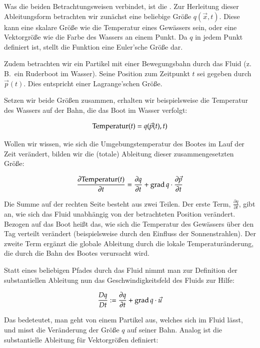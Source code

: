 Was die beiden Betrachtungsweisen verbindet, ist die
. Zur Herleitung dieser
Ableitungsform betrachten wir zunächst eine beliebige Größe
$q(\vec{x},t)$. Diese kann eine skalare Größe wie \PimiddyzB{} die Temperatur
eines Gewässers sein, oder eine Vektorgröße wie die Farbe des Wassers
an einem Punkt. Da $q$ in jedem Punkt definiert ist, stellt die
Funktion eine Euler'sche Größe dar.

Zudem betrachten wir ein Partikel mit einer Bewegungsbahn durch das
Fluid (z.\,B.\  ein Ruderboot im Wasser). Seine Position zum Zeitpunkt
$t$ sei gegeben durch $\vec{p}(t)$. Dies entspricht einer
Lagrange'schen Größe.

Setzen wir beide Größen zusammen, erhalten wir beispielsweise die
Temperatur des Wassers auf der Bahn, die das Boot im Wasser verfolgt:

\begin{equation}
\textnormal{Temperatur}(t) = q(\vec{p}(t),t)
\end{equation}

Wollen wir wissen, wie sich die Umgebungstemperatur des Bootes im Lauf
der Zeit verändert, bilden wir die (totale) Ableitung dieser
zusammengesetzten Größe:

\begin{equation}
\frac{
	\partial \textnormal{Temperatur}(t)
}
{
	\partial t
}
=
\frac{
	\partial q
}
{
	\partial t
}
+
\operatorname*{grad} q \cdot
\frac{
	\partial \vec{p}}
{
	\partial t
}
\end{equation}

Die Summe auf der rechten Seite besteht aus zwei Teilen. Der erste
Term, $\frac{\partial q}{\partial t}$, gibt an, wie sich das Fluid
unabhängig von der betrachteten Position verändert. Bezogen auf das
Boot heißt das, wie sich die Temperatur des Gewässers über den Tag
verteilt verändert (beispielsweise durch den Einfluss der
Sonnenstrahlen). Der zweite Term ergänzt die globale Ableitung durch
die lokale Temperaturänderung, die durch die Bahn des Bootes
verursacht wird.

Statt eines beliebigen Pfades durch das Fluid nimmt man zur Definition der
substantiellen Ableitung nun das Geschwindigkeitsfeld des Fluids zur Hilfe:

\begin{equation}
\frac{
	Dq}
{
	Dt
} :=
\frac{
	\partial q
}
{
	\partial t
}
+
\operatorname*{grad} q \cdot
\vec{u}
\end{equation}

Das bedeteutet, man geht von einem Partikel aus, welches sich im Fluid
 lässt, und misst die Veränderung der Größe $q$
auf seiner Bahn. Analog ist die substantielle Ableitung für
Vektorgrößen definiert:

